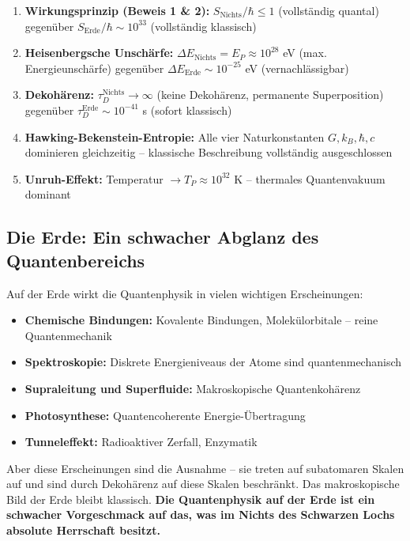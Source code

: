 ﻿\documentclass[12pt,a4paper]{report}
\begin{document}
\begin{enumerate}
    \item \textbf{Wirkungsprinzip (Beweis 1 \& 2):} $S_{\text{Nichts}}/\hbar \leq 1$ (vollständig quantal) gegenüber $S_{\text{Erde}}/\hbar \sim 10^{33}$ (vollständig klassisch)
    \item \textbf{Heisenbergsche Unschärfe:} $\Delta E_{\text{Nichts}} = E_P \approx 10^{28}$ eV (max. Energie\-unschärfe) gegenüber $\Delta E_{\text{Erde}} \sim 10^{-25}$ eV (vernachlässigbar)
    \item \textbf{Dekohärenz:} $\tau_D^{\text{Nichts}} \to \infty$ (keine Dekohärenz, permanente Superposition) gegenüber $\tau_D^{\text{Erde}} \sim 10^{-41}$ s (sofort klassisch)
    \item \textbf{Hawking-Bekenstein-Entropie:} Alle vier Naturkonstanten $G, k_B, \hbar, c$ dominieren gleichzeitig -- klassische Beschreibung vollständig ausgeschlossen
    \item \textbf{Unruh-Effekt:} Temperatur $\to T_P \approx 10^{32}$ K -- thermales Quantenvakuum dominant
\end{enumerate}

\subsection{Die Erde: Ein schwacher Abglanz des Quantenbereichs}

Auf der Erde wirkt die Quantenphysik in vielen wichtigen Erscheinungen:
\begin{itemize}
    \item \textbf{Chemische Bindungen:} Kovalente Bindungen, Molekülorbitale -- reine Quantenmechanik
    \item \textbf{Spektroskopie:} Diskrete Energieniveaus der Atome sind quantenmechanisch
    \item \textbf{Supraleitung und Superfluide:} Makroskopische Quantenkohärenz
    \item \textbf{Photosynthese:} Quantencoherente Energie-Übertragung
    \item \textbf{Tunneleffekt:} Radioaktiver Zerfall, Enzymatik
\end{itemize}
Aber diese Erscheinungen sind die Ausnahme -- sie treten auf subatomaren Skalen auf und sind durch Dekohärenz auf diese Skalen beschränkt. Das makroskopische Bild der Erde bleibt klassisch. \textbf{Die Quantenphysik auf der Erde ist ein schwacher Vorgeschmack auf das, was im Nichts des Schwarzen Lochs absolute Herrschaft besitzt.}
\end{document}
